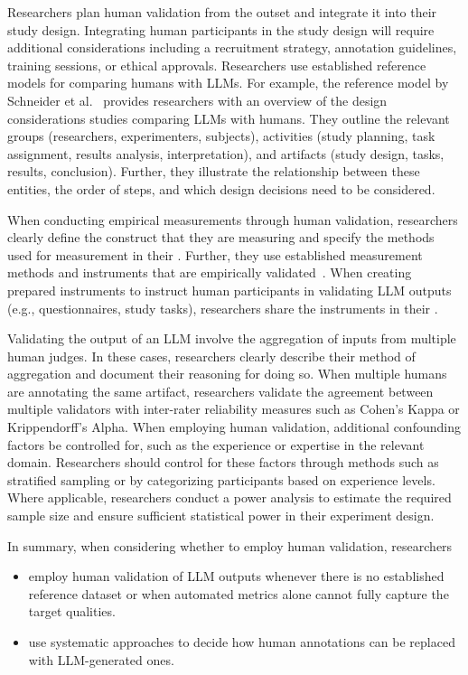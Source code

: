 Researchers \should plan human validation from the outset and integrate it into their study design.
Integrating human participants in the study design will require additional considerations including a recruitment strategy, annotation guidelines, training sessions, or ethical approvals.
Researchers \should use established reference models for comparing humans with LLMs.
For example, the reference model by Schneider et al.~\cite{Schneider2025ReferenceModel} provides researchers with an overview of the design considerations studies comparing LLMs with humans.
They outline the relevant groups (researchers, experimenters, subjects), activities (study planning, task assignment, results analysis, interpretation), and artifacts (study design, tasks, results, conclusion).
Further, they illustrate the relationship between these entities, the order of steps, and which design decisions need to be considered.

When conducting empirical measurements through human validation, researchers \must clearly define the construct that they are measuring and \must specify the methods used for measurement in their \paper.
Further, they \should use established measurement methods and instruments that are empirically validated~\cite{DBLP:journals/fcomp/HoffmanMKL23, DBLP:conf/chi/PerrigSB23}.
When creating prepared instruments to instruct human participants in validating LLM outputs (e.g., questionnaires, study tasks), researchers \should share the instruments in their \supplementarymaterial.

Validating the output of an LLM \may involve the aggregation of inputs from multiple human judges.
In these cases, researchers \should clearly describe their method of aggregation and document their reasoning for doing so.
When multiple humans are annotating the same artifact, researchers \should validate the agreement between multiple validators with inter-rater reliability measures such as Cohen's Kappa or Krippendorff's Alpha.
When employing human validation, additional confounding factors \should be controlled for, such as the experience or expertise in the relevant domain.
Researchers should control for these factors through methods such as stratified sampling or by categorizing participants based on experience levels.
Where applicable, researchers \should conduct a power analysis to estimate the required sample size and ensure sufficient statistical power in their experiment design.

In summary, when considering whether to employ human validation, researchers
\begin{itemize}
    \item \should employ human validation of LLM outputs whenever there is no established reference dataset or when automated metrics alone cannot fully capture the target qualities.
    \item \should use systematic approaches to decide how human annotations can be replaced with LLM-generated ones.
\end{itemize}

